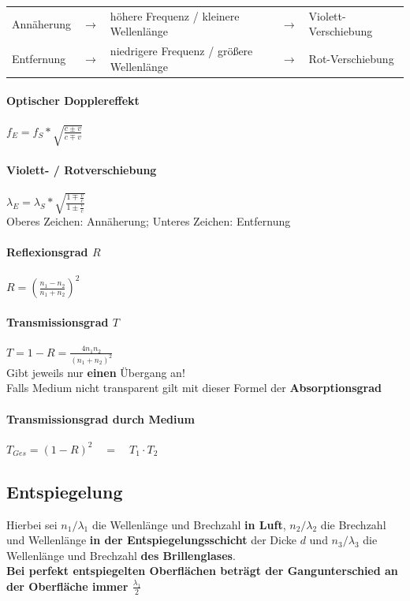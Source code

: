 \documentclass[12pt, a4paper]{scrreprt}
\begin{document}
\begin{framed}
  \textcolor{myred}{
    \begin{tabular}[h]{lclcl}
    Annäherung & $\rightarrow$ & höhere Frequenz / kleinere Wellenlänge & $\rightarrow$ & Violett-Verschiebung\\ 
    Entfernung & $\rightarrow$ & niedrigere Frequenz / größere Wellenlänge & $\rightarrow$ & Rot-Verschiebung
    \end{tabular}
  }
\end{framed}

\paragraph{Optischer Dopplereffekt} \dotfill \(f_E = f_S* \sqrt{\frac{c \pm v}{c \mp v}}\)
\paragraph{Violett- / Rotverschiebung} \dotfill \(\lambda_E = \lambda_S*\sqrt{\frac{1 \mp \frac{v}{c}}{1 \pm \frac{v}{c}}}\)\\
\myhspace{} \textcolor{myred}{Oberes Zeichen: Annäherung; Unteres Zeichen: Entfernung}
\paragraph{Reflexionsgrad \(R\)} \dotfill \(R = {\left( \frac{n_1 - n_2}{n_1 + n_2} \right)}^2\)
\paragraph{Transmissionsgrad \(T\)} \dotfill \(T = 1 - R = \frac{4 n_1 n_2}{{(n_1 + n_2)}^2}\)\\
\myhspace{} Gibt jeweils nur \textbf{einen} Übergang an!\\
\myhspace{} Falls Medium nicht transparent gilt mit dieser Formel der \textbf{Absorptionsgrad}
\paragraph{Transmissionsgrad \textbf{durch} Medium} \dotfill \(T_{Ges} = {(1 - R)}^2 \quad = \quad T_1 \cdot T_2\)


\subsection{Entspiegelung}
Hierbei sei \textbf{\(n_1 / \lambda_1\)} die Wellenlänge und Brechzahl \textbf{in Luft}, \textbf{\(n_2 / \lambda_2\)} die Brechzahl und Wellenlänge \textbf{in der Entspiegelungsschicht} der Dicke \(d\) und \textbf{\(n_3 / \lambda_3\)} die Wellenlänge und Brechzahl \textbf{des Brillenglases}.\\[1em]
\textbf{Bei perfekt entspiegelten Oberflächen beträgt der Gangunterschied an der Oberfläche immer \(\frac{\lambda_1}{2}\)}
\end{document}
